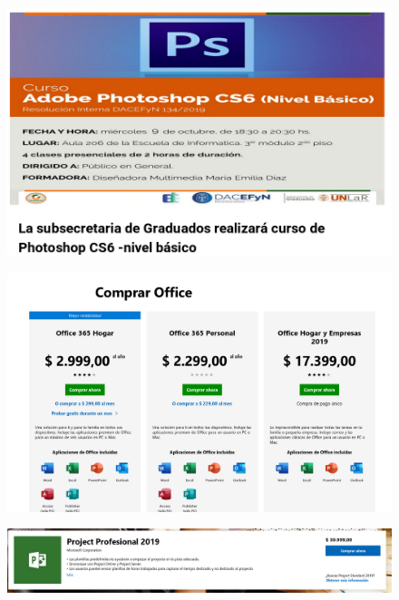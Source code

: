 \documentclass{fancyslides}
\begin{document}
\begin{frame}
\begin{figure}
	\centering
	\includegraphics[width=1\linewidth]{images/excel4}
	\label{fig:excel4}
\end{figure}
\end{frame}

\begin{frame}
	\begin{figure}
		\centering
		\includegraphics[width=1\linewidth]{images/precio_ms_office}
		\label{fig:preciomsoffice}
	\end{figure}
\end{frame}

\begin{frame}
	\begin{figure}
		\centering
		\includegraphics[width=1\linewidth]{images/precio_ms_project}
		\label{fig:preciomsproject}
	\end{figure}
	
\end{frame}
\end{document}
